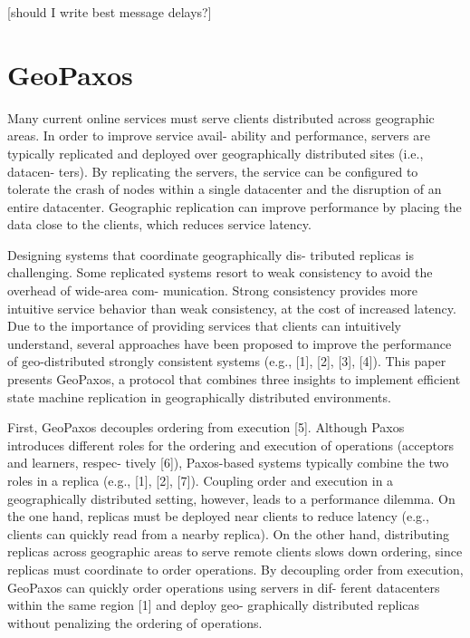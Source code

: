[should I write best message delays?]

\section{GeoPaxos}\label{sec:GeoPaxos}
Many current online services must serve clients distributed across geographic areas. In order to improve service avail- ability and performance, servers are typically replicated and deployed over geographically distributed sites (i.e., datacen- ters). By replicating the servers, the service can be configured to tolerate the crash of nodes within a single datacenter and the disruption of an entire datacenter. Geographic replication can improve performance by placing the data close to the clients, which reduces service latency.

Designing systems that coordinate geographically dis- tributed replicas is challenging. Some replicated systems resort to weak consistency to avoid the overhead of wide-area com- munication. Strong consistency provides more intuitive service behavior than weak consistency, at the cost of increased latency. Due to the importance of providing services that clients can intuitively understand, several approaches have been proposed to improve the performance of geo-distributed strongly consistent systems (e.g., [1], [2], [3], [4]). This paper presents GeoPaxos, a protocol that combines three insights to implement efficient state machine replication in geographically distributed environments.

First, GeoPaxos decouples ordering from execution [5]. Although Paxos introduces different roles for the ordering and execution of operations (acceptors and learners, respec- tively [6]), Paxos-based systems typically combine the two roles in a replica (e.g., [1], [2], [7]). Coupling order and execution in a geographically distributed setting, however, leads to a performance dilemma. On the one hand, replicas must be deployed near clients to reduce latency (e.g., clients can quickly read from a nearby replica). On the other hand, distributing replicas across geographic areas to serve remote clients slows down ordering, since replicas must coordinate to order operations. By decoupling order from execution, GeoPaxos can quickly order operations using servers in dif- ferent datacenters within the same region [1] and deploy geo- graphically distributed replicas without penalizing the ordering of operations.


